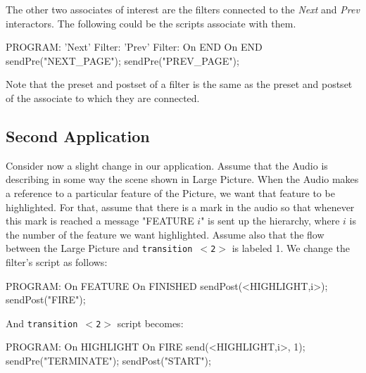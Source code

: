 \documentclass[twocolumn,10pt]{article}
\newcommand{\trans}[1]{{\tt transition $<$#1$>$}}
\newenvironment{program}{\verbatim PROGRAM:}{\endverbatim}
\newcommand{\lang}[1]{{\it #1}}
\begin{document}
The other two associates of interest are the filters connected to the
\lang{Next} and \lang{Prev} interactors.  The following could be the
scripts associate with them.

\small

\begin{program}
'Next' Filter:             'Prev' Filter:
On END {                   On END {                  
  sendPre("NEXT_PAGE");      sendPre("PREV_PAGE");   
}                          }                         
\end{program}

\normalsize

Note that the preset and postset of a filter is the same as the preset
and postset of the associate to which they are connected.


\subsection*{Second Application}

Consider now a slight change in our application.  Assume that the Audio is
describing in some way the scene shown in Large Picture.  When the
Audio makes a reference to a
particular feature of the Picture, we want that feature to be
highlighted.  For that, assume that there is a mark in the
audio so that whenever this mark is reached a message "FEATURE $i$"
is sent up the hierarchy, where $i$ is the number of the feature we want
highlighted.  Assume also that the flow between the Large Picture and
\trans{2} is labeled 1.  We change the filter's script as follows:

\small

\begin{program}                    
On FEATURE {                 On FINISHED {      
  sendPost(<HIGHLIGHT,i>);     sendPost("FIRE");
}                            }                  
\end{program}

\normalsize

And \trans{2} script becomes:

\small

\begin{program}
On HIGHLIGHT {              On FIRE {                   
  send(<HIGHLIGHT,i>, 1);     sendPre("TERMINATE");     
}                             sendPost("START");        
                            }                           
\end{program}

\normalsize
\end{document}
